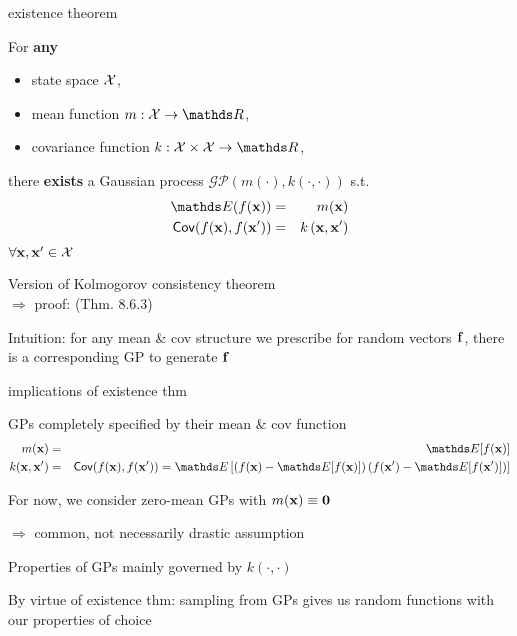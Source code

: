 \documentclass[11pt,compress,t,notes=noshow, xcolor=table]{beamer}
\begin{document}
\begin{framei}[sep=L]{existence theorem}
\item For \textbf{any} 
\begin{itemize}
\item state space $\mathcal{X}$,
\item mean function $m: \Xspace \rightarrow \R$,
\item covariance function $k: \Xspace \times \Xspace \rightarrow \R$, 
\end{itemize}
there \textbf{exists} a Gaussian process $\mathcal{GP}(m(\cdot), k(\cdot, \cdot))$ s.t.
\begin{eqnarray*}
\E(\fx) &=& m(\xv) \\
\cov(\fx, f(\xv^\prime)) &=& \kxxp
\end{eqnarray*}
$\forall \mathbf{x}, \mathbf{x}^\prime \in \mathcal{X}$
\item Version of Kolmogorov consistency theorem  \\
$\Rightarrow$ proof:  (Thm. 8.6.3)
\item Intuition: for any mean \& cov structure we prescribe for random vectors $\mathbf{f}$, there is a corresponding GP to generate $\mathbf{f}$
\end{framei}

\begin{framei}[sep=L]{implications of existence thm}
\item GPs completely specified by their mean \& cov function
\begin{eqnarray*}
m(\xv) &=& \E[f(\xv)] \\
k(\xv, \xv^\prime) &=& \cov(\fx, f(\xv^\prime)) = \E \left[\left( f(\xv) - \E[f(\xv)] \right) \left( f(\xv^\prime) - \E[f(\xv^\prime)] \right) \right]
\end{eqnarray*}
\item For now, we consider zero-mean GPs with $m(\mathbf{x}) \equiv \mathbf{0}$ 

$\Rightarrow$ common, not necessarily drastic assumption 
\item Properties of GPs mainly governed by $k(\cdot, \cdot)$
\item By virtue of existence thm: sampling from GPs gives us random functions with our properties of choice
\end{framei}
\end{document}
